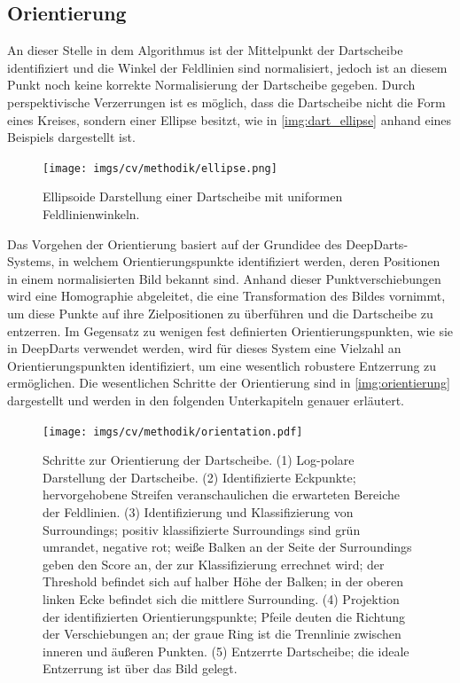 \vfill
\subsection{Orientierung}
\label{sec:orientierung}

An dieser Stelle in dem Algorithmus ist der Mittelpunkt der Dartscheibe identifiziert und die Winkel der Feldlinien sind normalisiert, jedoch ist an diesem Punkt noch keine korrekte Normalisierung der Dartscheibe gegeben. Durch perspektivische Verzerrungen ist es möglich, dass die Dartscheibe nicht die Form eines Kreises, sondern einer Ellipse besitzt, wie in \autoref{img:dart_ellipse} anhand eines Beispiels dargestellt ist.

\begin{figure}
    \centering
    \texttt{[image: imgs/cv/methodik/ellipse.png]}
    \caption{Ellipsoide Darstellung einer Dartscheibe mit uniformen Feldlinienwinkeln.}
    \label{img:dart_ellipse}
\end{figure}

Das Vorgehen der Orientierung basiert auf der Grundidee des DeepDarts-Systems, in welchem Orientierungspunkte identifiziert werden, deren Positionen in einem normalisierten Bild bekannt sind. Anhand dieser Punktverschiebungen wird eine Homographie abgeleitet, die eine Transformation des Bildes vornimmt, um diese Punkte auf ihre Zielpositionen zu überführen und die Dartscheibe zu entzerren. Im Gegensatz zu wenigen fest definierten Orientierungspunkten, wie sie in DeepDarts verwendet werden, wird für dieses System eine Vielzahl an Orientierungspunkten identifiziert, um eine wesentlich robustere Entzerrung zu ermöglichen. Die wesentlichen Schritte der Orientierung sind in \autoref{img:orientierung} dargestellt und werden in den folgenden Unterkapiteln genauer erläutert.

\begin{figure}
    \centering
    \texttt{[image: imgs/cv/methodik/orientation.pdf]}
    \caption{Schritte zur Orientierung der Dartscheibe. (1) Log-polare Darstellung der Dartscheibe. (2) Identifizierte Eckpunkte; hervorgehobene Streifen veranschaulichen die erwarteten Bereiche der Feldlinien. (3) Identifizierung und Klassifizierung von Surroundings; positiv klassifizierte Surroundings sind grün umrandet, negative rot; weiße Balken an der Seite der Surroundings geben den Score an, der zur Klassifizierung errechnet wird; der Threshold befindet sich auf halber Höhe der Balken; in der oberen linken Ecke befindet sich die mittlere Surrounding. (4) Projektion der identifizierten Orientierungspunkte; Pfeile deuten die Richtung der Verschiebungen an; der graue Ring ist die Trennlinie zwischen inneren und äußeren Punkten. (5) Entzerrte Dartscheibe; die ideale Entzerrung ist über das Bild gelegt.}
    \label{img:orientierung}
\end{figure}


